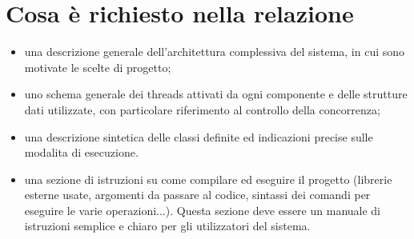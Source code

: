 
\section{Cosa è richiesto nella relazione}
\begin{itemize}
	\item una descrizione generale dell’architettura complessiva del sistema, in
	cui sono motivate le scelte di progetto;
	\item uno schema generale dei threads attivati da ogni componente e delle strutture dati utilizzate, con particolare riferimento al controllo della concorrenza;
	\item una descrizione sintetica delle classi definite ed indicazioni precise sulle modalita di esecuzione.
	\item una sezione di istruzioni su come compilare ed eseguire il progetto (librerie esterne usate, argomenti da passare al codice, sintassi dei comandi per eseguire le varie operazioni...). Questa sezione deve essere un manuale di istruzioni semplice e chiaro per gli utilizzatori del sistema.
\end{itemize}
